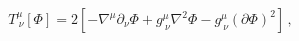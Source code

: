 \begin{equation}\label{stress_string_dilaton}
T^{\mu}_{\ \nu}\left[\Phi \right] =
2\left[-\nabla^{\mu}\partial_{\nu}\Phi + g^{\mu}_{\ \nu}
\nabla^{2}\Phi-g^{\mu}_{\ \nu}(\partial\Phi)^{2} \right] \, ,
%
\end{equation}


